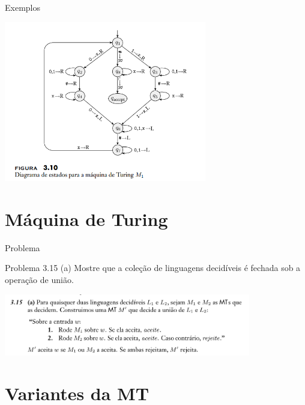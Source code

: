 \documentclass[xcolor=dvipsnames,table]{beamer}
\begin{document}
	\begin{frame}{Exemplos}
		\begin{center}
			\includegraphics[height=7cm]{images/fig310.png}
		\end{center}
	\end{frame}

	\section{Máquina de Turing}
	\begin{frame}{Problema}
		\begin{block}{Problema 3.15 (a)}
			Mostre que a coleção de linguagens decidíveis é fechada sob a operação de união.		
		\end{block} \pause
		\begin{center}
			\includegraphics[height=2.7cm]{images/ex3-15a}
		\end{center}
	\end{frame}
	
	\section{Variantes da MT}
\end{document}
